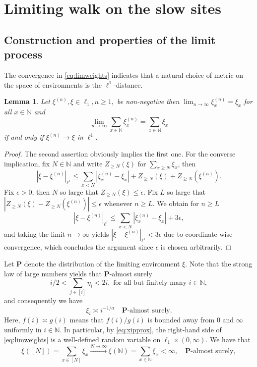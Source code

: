\documentclass[11pt,a4paper]{scrartcl}
\numberwithin{equation}{section}
\theoremstyle{plain}
\newtheorem{lemma}[theorem]{Lemma}
\theoremstyle{definition}
\theoremstyle{remark}
\newcommand{\bN}{\ensuremath{\mathbb{N}}}
\newcommand{\bfP}{\mathbf{P}}
\begin{document}
\section{Limiting walk on the slow sites}
\subsection*{Construction and properties of the limit process}

The convergence in \eqref{eq:limweights} indicates that a natural choice of metric on the space of environments is the $\ell^1$-distance.
\begin{lemma}
Let $\xi^{(n)},\xi\in\ell_1, n\geq 1,$ be non-negative then $\lim_{n\to\infty} \xi^{(n)}_x=\xi_x$ for all $x\in \bN$ and $$
\lim_{n\to\infty}\sum_{x\in\bN}\xi^{(n)}_x = \sum_{x\in\bN}\xi_x
$$
if and only if $\xi^{(n)}\to\xi$ in $\ell^1$.
\end{lemma}
\begin{proof}
The second assertion obviously implies the first one. For the converse implication, fix $N\in\bN$ and write $Z_{\geq N}(\xi)$ for $\sum_{x\geq N}\xi_x$, then
\[
|\xi-\xi^{(n)}|_{\ell^1}\leq \sum_{x<N}|\xi_{x}^{(n)}-\xi_x| + Z_{\geq N}(\xi)+ Z_{\geq N}(\xi^{(n)}).
\]
Fix $\epsilon>0$, then $N$ so large that $Z_{\geq N}(\xi)\leq \epsilon$. Fix $L$ so large that $|Z_{\geq N}(\xi)-Z_{\geq N}(\xi^{(n)})|\leq \epsilon$ whenever $n\ge L$. We obtain for $n\ge L$
\[
|\xi-\xi^{(n)}|_{\ell^1}\leq \sum_{x<N}|\xi_{x}^{(n)}-\xi_x|+3\epsilon,
\]
and taking the limit $n\to\infty$ yields $|\xi-\xi^{(n)}|_{\ell^1}<3\epsilon$ due to coordinate-wise convergence, which concludes the argument since $\epsilon$ is chosen arbitrarily.
\end{proof}
Let $\bfP$ denote the distribution of the limiting environment $\xi$. Note that the strong law of large numbers yields that $\bfP$-almost surely
$$
i/2 < \sum_{j\in[i]}\eta_i <2i, \text{ for all but finitely many }i\in\bN,
$$
and consequently we have
\begin{equation}\label{eq:xipprox}
	\xi_i \asymp i^{-1/\alpha}\quad \bfP\text{-almost surely}.
\end{equation}
Here, $f(i)\asymp g(i)$ means that $f(i)/g(i)$ is bounded away from $0$ and $\infty$ uniformly in $i\in\bN$. In particular, by \eqref{eq:xipprox}, the right-hand side of \eqref{eq:limweights} is a well-defined random variable on $\ell_1\times (0,\infty)$. We have that
$$
	\xi([N])
=\sum_{x\in[N]}\xi_x\overset{N\to\infty}{\longrightarrow}\xi(\mathbb{N})=\sum_{x\in\mathbb{N}}\xi_x<\infty,\quad \bfP\text{-almost surely},$$
\end{document}
